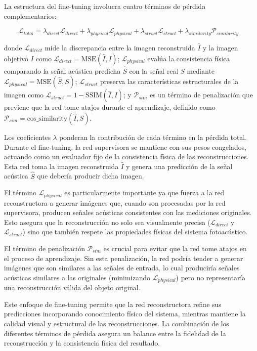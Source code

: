 La estructura del fine-tuning involucra cuatro términos de pérdida complementarios:

\begin{equation}
    \mathcal{L}_{total} = \lambda_{direct} \mathcal{L}_{direct} + \lambda_{physical} \mathcal{L}_{physical} + \lambda_{struct} \mathcal{L}_{struct} + \lambda_{similarity} \mathcal{P}_{similarity}
\end{equation}

donde $\mathcal{L}_{direct}$ mide la discrepancia entre la imagen reconstruida $\hat{I}$ y la imagen objetivo $I$ como $\mathcal{L}_{direct} = \text{MSE}(\hat{I}, I)$; $\mathcal{L}_{physical}$ evalúa la consistencia física comparando la señal acústica predicha $\hat{S}$ con la señal real $S$ mediante $\mathcal{L}_{physical} = \text{MSE}(\hat{S}, S)$; $\mathcal{L}_{struct}$ preserva las características estructurales de la imagen como $\mathcal{L}_{struct} = 1 - \text{SSIM}(\hat{I}, I)$; y $\mathcal{P}_{sim}$ es un término de penalización que previene que la red tome atajos durante el aprendizaje, definido como $\mathcal{P}_{sim} = \text{cos\_similarity}(\hat{I}, S)$.

Los coeficientes $\lambda$ ponderan la contribución de cada término en la pérdida total. Durante el fine-tuning, la red supervisora se mantiene con sus pesos congelados, actuando como un evaluador fijo de la consistencia física de las reconstrucciones. Esta red toma la imagen reconstruida $\hat{I}$ y genera una predicción de la señal acústica $\hat{S}$ que debería producir dicha imagen.

El término $\mathcal{L}_{physical}$ es particularmente importante ya que fuerza a la red reconstructora a generar imágenes que, cuando son procesadas por la red supervisora, producen señales acústicas consistentes con las mediciones originales. Esto asegura que la reconstrucción no solo sea visualmente precisa ($\mathcal{L}_{direct}$ y $\mathcal{L}_{struct}$) sino que también respete las propiedades físicas del sistema fotoacústico.

El término de penalización $\mathcal{P}_{sim}$ es crucial para evitar que la red tome atajos en el proceso de aprendizaje. Sin esta penalización, la red podría tender a generar imágenes que son similares a las señales de entrada, lo cual produciría señales acústicas similares a las originales (minimizando $\mathcal{L}_{physical}$) pero no representaría una reconstrucción válida del objeto original.

Este enfoque de fine-tuning permite que la red reconstructora refine sus predicciones incorporando conocimiento físico del sistema, mientras mantiene la calidad visual y estructural de las reconstrucciones. La combinación de los diferentes términos de pérdida asegura un balance entre la fidelidad de la reconstrucción y la consistencia física del resultado.

